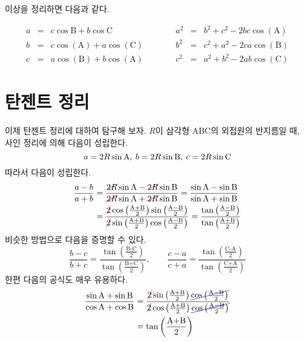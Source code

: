 \documentclass[11pt, a4paper]{book}
\begin{document}
이상을 정리하면 다음과 같다.
\begin{theorem}[코사인 정리]\vspace{-1em}
\[
	\begin{array}{cclccl}
	a &=& c \cos{\textrm{B}} + b \cos{\textrm{C}}\quad & \qquad a^{2}&=& b^{2} + c^{2} - 2 bc \cos(\textrm{A}) \\
	b &=& c \cos(\textrm{A}) + a \cos(\textrm{C}) \quad & \qquad 	b^{2}&=& c^{2} + a^{2} - 2 ca \cos(\textrm{B}) \\
	c&=& a \cos(\textrm{B}) + b \cos(\textrm{A})\quad & \qquad 	c^{2}&=& a^{2} + b^{2} - 2 ab \cos(\textrm{C})
	\end{array}
\]
\end{theorem}

\section{탄젠트 정리}
이제 탄젠트 정리에 대하여 탐구해 보자. $R$이 삼각형 \textrm{ABC}의 외접원의 반지름일 때, 사인 정리에 의해 다음이 성립한다.
\[
a = 2R \sin \textrm{A},\: b = 2R \sin \textrm{B}, \: c=2R \sin \textrm{C}
\]
따라서 다음이 성립한다.
\begin{align*}
	\frac{a-b}{a+b} & = \frac{\Ccancel[red]{2R} \sinrm{A}-\Ccancel[red]{2R} \sinrm{B}}{\Ccancel[red]{2R} \sinrm{A}+\Ccancel[red]{2R} \sinrm{B}}=\frac{\sinrm{A}-\sinrm{B}}{\sinrm{A}+\sinrm{B}}\\
	&=\frac{\Ccancel[red]{2} \cos\left(\frac{\textrm{A+B}}{2}\right) \sin\left(\frac{\textrm{A}-\textrm{B}}{2}\right)}{\Ccancel[red]{2} \sin\left(\frac{\textrm{A+B}}{2}\right) \cos\left(\frac{\textrm{A}-\textrm{B}}{2}\right)} = \frac{\tan\left(\frac{\textrm{A}-\textrm{B}}{2}\right)}{\tan\left(\frac{\textrm{A+B}}{2}\right)}
\end{align*}
비슷한 방법으로 다음을 증명할 수 있다.
\[
	\frac{b-c}{b+c}=\frac{\tan\left(\frac{\textrm{B-C}}{2}\right)}{\tan\left(\frac{\textrm{B+C}}{2}\right)},\qquad \frac{c-a}{c+a}=\frac{\tan\left(\frac{\textrm{C-A}}{2}\right)}{\tan\left(\frac{\textrm{C+A}}{2}\right)}
\]
한편 다음의 공식도 매우 유용하다.
\begin{align*}
	\frac{\sinrm{A}+\sinrm{B}}{\cosrm{A}+\cosrm{B}} &= \frac{\Ccancel[red]{2}\sin\left(\frac{\textrm{A+B}}{2}\right) \Ccancel[blue]{\cos \left(\frac{\textrm{A}-\textrm{B}}{2}\right)}}{\Ccancel[red]{2}\cos\left(\frac{\textrm{A+B}}{2}\right) \Ccancel[blue]{\cos \left(\frac{\textrm{A}-\textrm{B}}{2}\right)}}\\
	&= \tan\left(\frac{\textrm{A+B}}{2}\right)
\end{align*}
\end{document}
